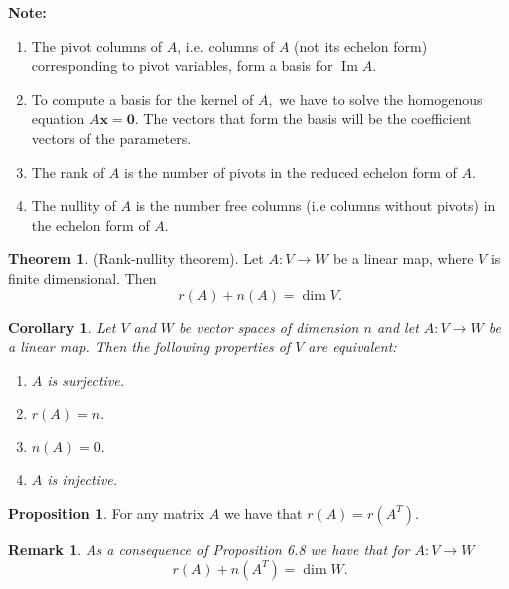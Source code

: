 \documentclass[12pt, a4paper]{article}
\newtheorem*{remark}{Remark}
\theoremstyle{definition}
\newtheorem{theorem}{Theorem}[section]
\newtheorem{proposition}{Proposition}
\theoremstyle{plain}
\newtheorem{corollary}{Corollary}[theorem]
\newcommand{\vect}[1]{\mathbf{#1}}
\DeclareMathOperator{\im}{Im}
\begin{document}
\begin{tcolorbox}

\textbf{Note:}

\begin{enumerate}
	
	\item The pivot columns of $A$, i.e. columns of $A$ (not its echelon form) corresponding to pivot variables, form a basis for $\im{A}.$

	\item To compute a basis for the kernel of $A,$ we have to solve the homogenous equation $A\vect{x} = \vect{0}.$ The vectors that form the basis will be the coefficient vectors of the parameters.

	\item The rank of $A$ is the number of pivots in the reduced echelon form of $A.$

	\item The nullity of $A$ is the number free columns (i.e columns without pivots) in the echelon form of $A.$

\end{enumerate}
\end{tcolorbox}

\begin{theorem}(Rank-nullity theorem). Let $A : V \rightarrow W$ be a linear map, where $V$ is finite dimensional. Then $$r(A)+n(A)=\dim{V}.$$\end{theorem}

\begin{corollary} Let $V$ and $W$ be vector spaces of dimension $n$ and let $A : V \rightarrow W$ be a linear map. Then the following properties of $V$ are equivalent: 
\begin{enumerate}
	
	\item[(i)] $A$ is surjective.
	\item[(ii)] $r(A)=n.$
	\item[(iii)] $n(A)=0.$
	\item[(iv)] $A$ is injective.

\end{enumerate}
\end{corollary}

\begin{proposition} For any matrix $A$ we have that $r(A)=r(A^T).$ \end{proposition}

\begin{remark} 
As a consequence of Proposition 6.8 we have that for $A : V \rightarrow W$ $$r(A)+n(A^T)=\dim{W}.$$
\end{remark} 
\end{document}
